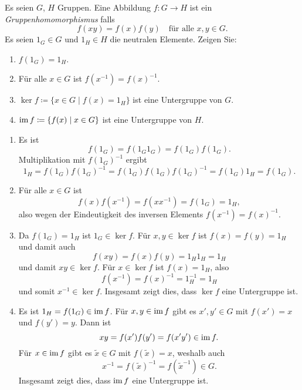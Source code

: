 \begin{question}
 Es seien $G$, $H$ Gruppen. Eine Abbildung $f \colon G \to H$ ist ein \emph{Gruppenhomomorphismus} falls
 \[
  f(xy) = f(x) f(y) \quad \text{für alle $x,y \in G$}.
 \]
 Es seien $1_G \in G$ und $1_H \in H$ die neutralen Elemente. Zeigen Sie:
 \begin{enumerate}
  \item
   $f(1_G) = 1_H$.
  \item
   Für alle $x \in G$ ist $f(x^{-1}) = f(x)^{-1}$.
  \item
   $\ker f \coloneqq \{x \in G \mid f(x) = 1_H\}$ ist eine Untergruppe von $G$.
  \item
   $\operatorname{im} f \coloneqq \{f(x) \mid x \in G\}$ ist eine Untergruppe von $H$.
 \end{enumerate}
\end{question}
\begin{solution}
 \begin{enumerate}
  \item
   Es ist
   \[
    f(1_G) = f(1_G 1_G) = f(1_G) f(1_G).
   \]
   Multiplikation mit $f(1_G)^{-1}$ ergibt
   \[
    1_H = f(1_G) f(1_G)^{-1} = f(1_G) f(1_G) f(1_G)^{-1} = f(1_G) 1_H = f(1_G).
   \]
  \item
   Für alle $x \in G$ ist
   \[
    f(x) f(x^{-1}) = f(x x^{-1}) = f(1_G) = 1_H,
   \]
   also wegen der Eindeutigkeit des inversen Elements $f(x^{-1}) = f(x)^{-1}$.
  \item
   Da $f(1_G) = 1_H$ ist $1_G \in \ker f$. Für $x, y \in \ker f$ ist $f(x) = f(y) = 1_H$ und damit auch
   \[
    f(xy) = f(x) f(y) = 1_H 1_H = 1_H
   \]
   und damit $xy \in \ker f$. Für $x \in \ker f$ ist $f(x) = 1_H$, also
   \[
    f(x^{-1}) = f(x)^{-1} = 1_H^{-1} = 1_H
   \]
   und somit $x^{-1} \in \ker f$. Insgesamt zeigt dies, dass $\ker f$ eine Untergruppe ist.
  \item
   Es ist $1_H = f(1_G) \in \operatorname{im} f$. Für $x, y \in \operatorname{im} f$ gibt es $x', y' \in G$ mit $f(x') = x$ und $f(y') = y$. Dann ist
   \[
    xy = f(x') f(y') = f(x' y') \in \operatorname{im} f.
   \]
   Für $x \in \operatorname{im} f$ gibt es $\tilde{x} \in G$ mit $f(\tilde{x}) = x$, weshalb auch
   \[
    x^{-1} = f(\tilde{x})^{-1} = f(\tilde{x}^{-1}) \in G.
   \]
   Insgesamt zeigt dies, dass $\operatorname{im} f$ eine Untergruppe ist.
 \end{enumerate}
\end{solution}


